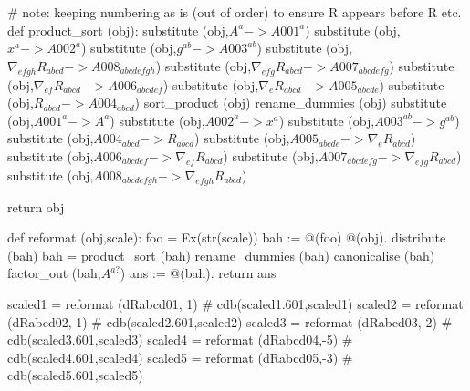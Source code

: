 \documentclass[12pt]{cdblatex}
\begin{document}
\begin{cadabra}
   # note: keeping numbering as is (out of order) to ensure R appears before \nabla R etc.
   def product_sort (obj):
       substitute (obj,$ A^{a}                            -> A001^{a}               $)
       substitute (obj,$ x^{a}                            -> A002^{a}               $)
       substitute (obj,$ g^{a b}                          -> A003^{a b}             $)
       substitute (obj,$ \nabla_{e f g h}{R_{a b c d}}    -> A008_{a b c d e f g h} $)
       substitute (obj,$ \nabla_{e f g}{R_{a b c d}}      -> A007_{a b c d e f g}   $)
       substitute (obj,$ \nabla_{e f}{R_{a b c d}}        -> A006_{a b c d e f}     $)
       substitute (obj,$ \nabla_{e}{R_{a b c d}}          -> A005_{a b c d e}       $)
       substitute (obj,$ R_{a b c d}                      -> A004_{a b c d}         $)
       sort_product   (obj)
       rename_dummies (obj)
       substitute (obj,$ A001^{a}                  -> A^{a}                         $)
       substitute (obj,$ A002^{a}                  -> x^{a}                         $)
       substitute (obj,$ A003^{a b}                -> g^{a b}                       $)
       substitute (obj,$ A004_{a b c d}            -> R_{a b c d}                   $)
       substitute (obj,$ A005_{a b c d e}          -> \nabla_{e}{R_{a b c d}}       $)
       substitute (obj,$ A006_{a b c d e f}        -> \nabla_{e f}{R_{a b c d}}     $)
       substitute (obj,$ A007_{a b c d e f g}      -> \nabla_{e f g}{R_{a b c d}}   $)
       substitute (obj,$ A008_{a b c d e f g h}    -> \nabla_{e f g h}{R_{a b c d}} $)

       return obj

   def reformat (obj,scale):
       foo  = Ex(str(scale))
       bah := @(foo) @(obj).
       distribute     (bah)
       bah = product_sort (bah)
       rename_dummies (bah)
       canonicalise   (bah)
       factor_out     (bah,$A^{a?}$)
       ans := @(bah).
       return ans

   scaled1 = reformat (dRabcd01, 1)    # cdb(scaled1.601,scaled1)
   scaled2 = reformat (dRabcd02, 1)    # cdb(scaled2.601,scaled2)
   scaled3 = reformat (dRabcd03,-2)    # cdb(scaled3.601,scaled3)
   scaled4 = reformat (dRabcd04,-5)    # cdb(scaled4.601,scaled4)
   scaled5 = reformat (dRabcd05,-3)    # cdb(scaled5.601,scaled5)

\end{cadabra}

\clearpage

\end{document}
